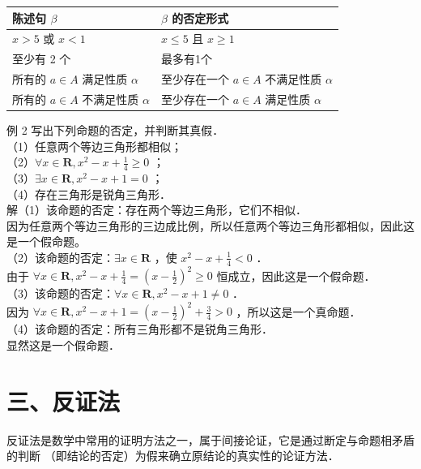 \documentclass[10pt]{article}
\begin{document}
\begin{center}
\begin{tabular}{|l|l|}
\hline
陈述句 \(\beta\) & \(\beta\) 的否定形式 \\
\hline
\(x>5\) 或 \(x<1\) & \(x \leqslant 5\) 且 \(x \geqslant 1\) \\
\hline
至少有 2 个 & 最多有1个 \\
\hline
所有的 \(a \in A\) 满足性质 \(\alpha\) & 至少存在一个 \(a \in A\) 不满足性质 \(\alpha\) \\
\hline
所有的 \(a \in A\) 不满足性质 \(\alpha\) & 至少存在一个 \(a \in A\) 满足性质 \(\alpha\) \\
\hline
\end{tabular}
\end{center}

例 2 写出下列命题的否定，并判断其真假．\\
（1）任意两个等边三角形都相似；\\
（2）\(\forall x \in \mathbf{R}, x^{2}-x+\frac{1}{4} \geqslant 0\) ；\\
（3）\(\exists x \in \mathbf{R}, x^{2}-x+1=0\) ；\\
（4）存在三角形是锐角三角形．\\
解（1）该命题的否定：存在两个等边三角形，它们不相似．\\
因为任意两个等边三角形的三边成比例，所以任意两个等边三角形都相似，因此这是一个假命题。\\
（2）该命题的否定：\(\exists x \in \mathbf{R}\) ，使 \(x^{2}-x+\frac{1}{4}<0\) ．\\
由于 \(\forall x \in \mathbf{R}, x^{2}-x+\frac{1}{4}=\left(x-\frac{1}{2}\right)^{2} \geqslant 0\) 恒成立，因此这是一个假命题．\\
（3）该命题的否定：\(\forall x \in \mathbf{R}, x^{2}-x+1 \neq 0\) ．\\
因为 \(\forall x \in \mathbf{R}, x^{2}-x+1=\left(x-\frac{1}{2}\right)^{2}+\frac{3}{4}>0\) ，所以这是一个真命题．\\
（4）该命题的否定：所有三角形都不是锐角三角形．\\
显然这是一个假命题．

\section*{三、反证法}
反证法是数学中常用的证明方法之一，属于间接论证，它是通过断定与命题相矛盾的判断 （即结论的否定）为假来确立原结论的真实性的论证方法．
\end{document}
